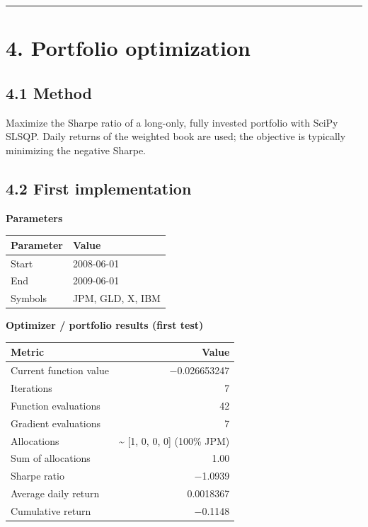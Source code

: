 \documentclass[
  11pt,
]{article}
\begin{document}
\begin{center}\rule{0.5\linewidth}{0.5pt}\end{center}

\section{4. Portfolio optimization}\label{portfolio-optimization}

\subsection{4.1 Method}\label{method}

Maximize the Sharpe ratio of a long-only, fully invested portfolio with
SciPy SLSQP. Daily returns of the weighted book are used; the objective
is typically minimizing the negative Sharpe.

\subsection{4.2 First implementation}\label{first-implementation}

\textbf{Parameters}

\begin{longtable}[]{@{}ll@{}}
\toprule\noalign{}
Parameter & Value \\
\midrule\noalign{}
\endhead
\bottomrule\noalign{}
\endlastfoot
Start & 2008-06-01 \\
End & 2009-06-01 \\
Symbols & JPM, GLD, X, IBM \\
\end{longtable}

\textbf{Optimizer / portfolio results (first test)}

\begin{longtable}[]{@{}lr@{}}
\toprule\noalign{}
Metric & Value \\
\midrule\noalign{}
\endhead
\bottomrule\noalign{}
\endlastfoot
Current function value & −0.026653247 \\
Iterations & 7 \\
Function evaluations & 42 \\
Gradient evaluations & 7 \\
Allocations & \textasciitilde{} {[}1, 0, 0, 0{]} (100\% JPM) \\
Sum of allocations & 1.00 \\
Sharpe ratio & −1.0939 \\
Average daily return & 0.0018367 \\
Cumulative return & −0.1148 \\
\end{longtable}
\end{document}
